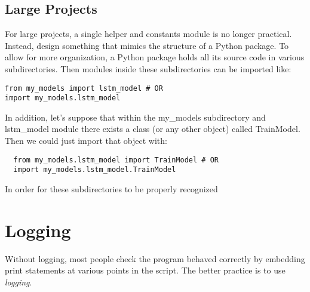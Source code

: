 \documentclass{article}%
\begin{document}
\subsection{Large Projects}
For large projects, a single helper and constants module is no longer practical.
Instead, design something that mimics the structure of a Python package. 
To allow for more organization, a Python package holds all its source code 
in various subdirectories. Then modules inside these subdirectories can be 
imported like:

\begin{lstlisting}
from my_models import lstm_model # OR
import my_models.lstm_model
\end{lstlisting}

In addition, let's suppose that within the my\_models subdirectory and 
lstm\_model module there exists a class (or any other object) called 
TrainModel. Then we could just import that object with:

\begin{lstlisting}
  from my_models.lstm_model import TrainModel # OR
  import my_models.lstm_model.TrainModel
\end{lstlisting}

In order for these subdirectories to be properly recognized

\section{Logging}
Without logging, most people check the program behaved correctly by embedding print statements at various points in the script. The better practice is to use \textit{logging}. \\
\end{document}
